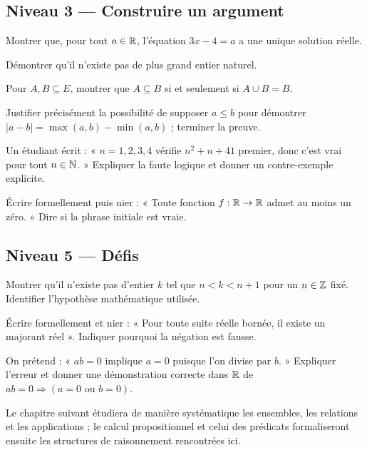 \subsection*{Niveau 3 — Construire un argument}
\begin{exercice}\label{ex:log:10}
Montrer que, pour tout $a\in\mathbb R$, l'équation $3x-4=a$ a une unique solution réelle.
\end{exercice}
\begin{exercice}[L'absurde]\label{ex:log:11}
Démontrer qu'il n'existe pas de plus grand entier naturel.
\end{exercice}
\begin{exercice}\label{ex:log:12}
Pour $A,B\subseteq E$, montrer que $A\subseteq B$ si et seulement si $A\cup B=B$.
\end{exercice}
\begin{exercice}\label{ex:log:13}
Justifier précisément la possibilité de supposer $a\le b$ pour démontrer $|a-b|=\max(a,b)-\min(a,b)$ ; terminer la preuve.
\end{exercice}
\begin{exercice}\label{ex:log:14}
Un étudiant écrit : « $n=1,2,3,4$ vérifie $n^2+n+41$ premier, donc c'est vrai pour tout $n\in\mathbb N$. » Expliquer la faute logique et donner un contre-exemple explicite.
\end{exercice}
\begin{exercice}\label{ex:log:15}
Écrire formellement puis nier : « Toute fonction $f:\mathbb R\to\mathbb R$ admet au moins un zéro. » Dire si la phrase initiale est vraie.
\end{exercice}

\subsection*{Niveau 5 — Défis}
\begin{exercice}\label{ex:log:16}
Montrer qu'il n'existe pas d'entier $k$ tel que $n<k<n+1$ pour un $n\in\mathbb Z$ fixé. Identifier l'hypothèse mathématique utilisée.
\end{exercice}
\begin{exercice}\label{ex:log:17}
Écrire formellement et nier : « Pour toute suite réelle bornée, il existe un majorant réel ». Indiquer pourquoi la négation est fausse.
\end{exercice}
\begin{exercice}\label{ex:log:18}
On prétend : « $ab=0$ implique $a=0$ puisque l'on divise par $b$. » Expliquer l'erreur et donner une démonstration correcte dans $\mathbb R$ de $ab=0\Rightarrow(a=0\text{ ou }b=0)$.
\end{exercice}

\begin{retenir}
Le chapitre suivant étudiera de manière systématique les ensembles, les relations et les applications ; le calcul propositionnel et celui des prédicats formaliseront ensuite les structures de raisonnement rencontrées ici.
\end{retenir}
